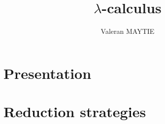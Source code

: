 \documentclass{article}
\title{$\lambda$-calculus}
\author{Valeran MAYTIE}
\date{}
\theoremstyle{plain}
\theoremstyle{plain}
\begin{document}
  \maketitle

  \tableofcontents

  \newpage
  \section{Presentation}

  

  \newpage
  \section{Reduction strategies}

  
\end{document}
